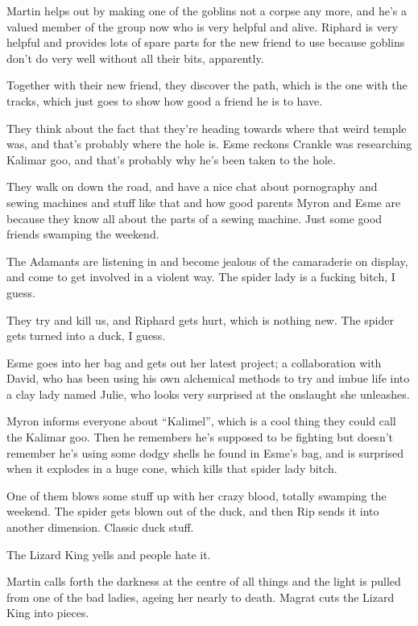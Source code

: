 Martin helps out by making one of the goblins not a corpse any more, and he’s a valued member of the group now who is very helpful and alive. Riphard is very helpful and provides lots of spare parts for the new friend to use because goblins don’t do very well without all their bits, apparently.\medskip

Together with their new friend, they discover the path, which is the one with the tracks, which just goes to show how good a friend he is to have.\medskip

They think about the fact that they’re heading towards where that weird temple was, and that’s probably where the hole is. Esme reckons Crankle was researching Kalimar goo, and that’s probably why he’s been taken to the hole.\medskip

They walk on down the road, and have a nice chat about pornography and sewing machines and stuff like that and how good parents Myron and Esme are because they know all about the parts of a sewing machine. Just some good friends swamping the weekend.\medskip

The Adamants are listening in and become jealous of the camaraderie on display, and come to get involved in a violent way. The spider lady is a fucking bitch, I guess.\medskip

They try and kill us, and Riphard gets hurt, which is nothing new. The spider gets turned into a duck, I guess.\medskip

Esme goes into her bag and gets out her latest project; a collaboration with David, who has been using his own alchemical methods to try and imbue life into a clay lady named Julie, who looks very surprised at the onslaught she unleashes.\medskip

Myron informs everyone about “Kalimel”, which is a cool thing they could call the Kalimar goo. Then he remembers he’s supposed to be fighting but doesn’t remember he’s using some dodgy shells he found in Esme’s bag, and is surprised when it explodes in a huge cone, which kills that spider lady bitch.\medskip

One of them blows some stuff up with her crazy blood, totally swamping the weekend. The spider gets blown out of the duck, and then Rip sends it into another dimension. Classic duck stuff.\medskip

The Lizard King yells and people hate it.\medskip

Martin calls forth the darkness at the centre of all things and the light is pulled from one of the bad ladies, ageing her nearly to death. Magrat cuts the Lizard King into pieces.\medskip

